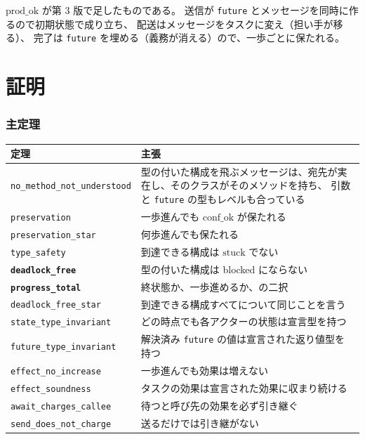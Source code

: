\documentclass[11pt,a4paper]{ltjsarticle}
\theoremstyle{definition}
\theoremstyle{remark}
\newcommand{\confok}{\mathrm{conf\_ok}}
\newcommand{\stuck}{\mathrm{stuck}}
\newcommand{\prodok}{\mathrm{prod\_ok}}
\begin{document}
$\prodok$ が第 3 版で足したものである。
送信が \texttt{future} とメッセージを同時に作るので初期状態で成り立ち、
配送はメッセージをタスクに変え（担い手が移る）、
完了は \texttt{future} を埋める（義務が消える）ので、一歩ごとに保たれる。

\part{証明}
\label{part:proof}

\section{主定理}

\begin{center}
\small
\begin{tabular}{@{}lp{8.4cm}@{}}
\toprule
定理 & 主張 \\
\midrule
\texttt{no\_method\_not\_understood} &
  型の付いた構成を飛ぶメッセージは、宛先が実在し、そのクラスがそのメソッドを持ち、
  引数と \texttt{future} の型もレベルも合っている \\
\texttt{preservation} & 一歩進んでも $\confok$ が保たれる \\
\texttt{preservation\_star} & 何歩進んでも保たれる \\
\texttt{type\_safety} & 到達できる構成は $\stuck$ でない \\
\textbf{\texttt{deadlock\_free}} & 型の付いた構成は blocked にならない \\
\textbf{\texttt{progress\_total}} & 終状態か、一歩進めるか、の二択 \\
\texttt{deadlock\_free\_star} & 到達できる構成すべてについて同じことを言う \\
\texttt{state\_type\_invariant} & どの時点でも各アクターの状態は宣言型を持つ \\
\texttt{future\_type\_invariant} & 解決済み \texttt{future} の値は宣言された返り値型を持つ \\
\addlinespace
\texttt{effect\_no\_increase} & 一歩進んでも効果は増えない \\
\texttt{effect\_soundness} & タスクの効果は宣言された効果に収まり続ける \\
\texttt{await\_charges\_callee} & 待つと呼び先の効果を必ず引き継ぐ \\
\texttt{send\_does\_not\_charge} & 送るだけでは引き継がない \\
\bottomrule
\end{tabular}
\end{center}
\end{document}
